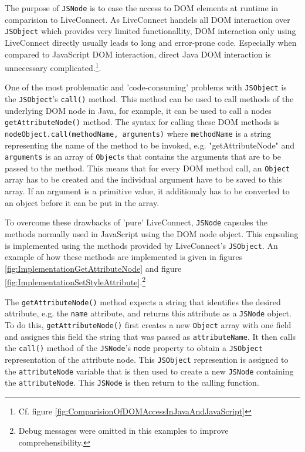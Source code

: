 The purpose of \texttt{JSNode} is to ease the access to DOM elements at runtime in comparision to LiveConnect. As LiveConnect handels all DOM interaction over \texttt{JSObject} which provides very limited functionallity, DOM interaction only using LiveConnect directly usually leads to long and error-prone code. Especially when compared to JavaScript DOM interaction, direct Java DOM interaction is unnecessary complicated.\footnote{Cf. figure \ref{fig:ComparisionOfDOMAccessInJavaAndJavaScript}}. 

One of the most problematic and 'code-consuming' problems with \texttt{JSObject} is the \texttt{JSObject}'s \texttt{call()} method. This method can be used to call methods of the underlying DOM node in Java, for example, it can be used to call a nodes \texttt{getAttributeNode()} method. The syntax for calling these DOM methods is \texttt{nodeObject.call(methodName, arguments)} where \texttt{methodName} is a string representing the name of the method to be invoked, e.g. "getAttributeNode" and \texttt{arguments} is an array of \texttt{Object}s that contains the arguments that are to be passed to the method. This means that for every DOM method call, an \texttt{Object} array has to be created and the individual argument have to be saved to this array. If an argument is a primitive value, it additionaly has to be converted to an object before it can be put in the array. 

To overcome these drawbacks of 'pure' LiveConnect, \texttt{JSNode} capsules the methods normally used in JavaScript using the DOM node object. This capsuling is implemented using the methods provided by LiveConnect's \texttt{JSObject}. An example of how these methods are implemented is given in figures \ref{fig:ImplementationGetAttributeNode} and figure \ref{fig:ImplementationSetStyleAttribute}.\footnote{Debug messages were omitted in this examples to improve comprehensibility.}

The \texttt{getAttributeNode()} method expects a string that identifies the desired attribute, e.g. the \texttt{name} attribute, and returns this attribute as a \texttt{JSNode} object. To do this, \texttt{getAttributeNode()} first creates a new \texttt{Object} array with one field and assignes this field the string that was passed as \texttt{attributeName}. It then calls the \texttt{call()} method of the \texttt{JSNode}'s \texttt{node} property to obtain a \texttt{JSObject} representation of the attribute node. This \texttt{JSObject} represention is assigned to the \texttt{attributeNode} variable that is then used to create a new \texttt{JSNode} containing the \texttt{attributeNode}. This \texttt{JSNode} is then return to the calling function.

